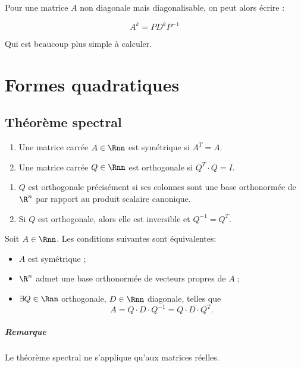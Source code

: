 Pour une matrice $A$ non diagonale mais diagonalisable, on peut alors écrire :

$$A^k = PD^kP^{-1}$$

Qui est beaucoup plus simple à calculer.


\section{Formes quadratiques}

\subsection{Théorème spectral}

\begin{mydef}\InsertTheoremBreak
	\begin{enumerate}
		\item Une matrice carrée $A \in \Rnn$ est symétrique si $A^T = A$.
		\item Une matrice carrée $Q \in \Rnn$ est orthogonale si $Q^T\cdot Q = I$.
	\end{enumerate}
\end{mydef}

\begin{myrem}\InsertTheoremBreak
	\begin{enumerate}
		\item $Q$ est orthogonale précisément si ses colonnes sont une base orthonormée de $\R^n$ par rapport au produit scalaire canonique.
		\item Si $Q$ est orthogonale, alors elle est inversible et $Q^{-1} = Q^T$.
	\end{enumerate}
\end{myrem}

\begin{mytheo}
	Soit $A \in \Rnn$.
	Les conditions suivantes sont équivalentes:
	\begin{itemize}
		\item $A$ est symétrique ;
		\item $\R^n$ admet une base orthonormée de vecteurs propres de $A$ ;
		\item $\exists Q \in \Rnn$ orthogonale, $D \in \Rnn$ diagonale, telles que
			\[ A = Q \cdot D \cdot Q^{-1} = Q \cdot D \cdot Q^T. \]
	\end{itemize}
	\subparagraph{Remarque}
	Le théorème spectral ne s'applique qu'aux matrices réelles.
\end{mytheo}

